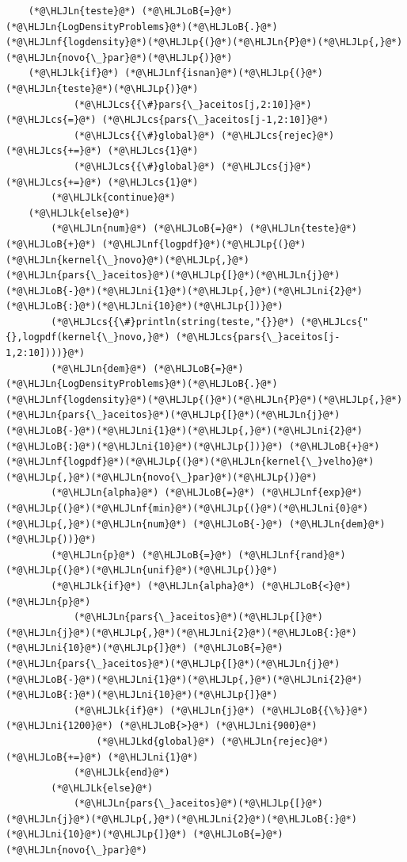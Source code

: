 \documentclass[12pt,a4paper]{article}
\newcommand{\HLJLk}[1]{\textcolor[RGB]{148,91,176}{\textbf{#1}}}
\newcommand{\HLJLkd}[1]{\textcolor[RGB]{214,102,97}{\textit{#1}}}
\newcommand{\HLJLn}[1]{#1}
\newcommand{\HLJLnf}[1]{\textcolor[RGB]{66,102,213}{#1}}
\newcommand{\HLJLni}[1]{\textcolor[RGB]{59,151,46}{#1}}
\newcommand{\HLJLoB}[1]{\textcolor[RGB]{102,102,102}{\textbf{#1}}}
\newcommand{\HLJLp}[1]{#1}
\newcommand{\HLJLcs}[1]{\textcolor[RGB]{153,153,119}{\textit{#1}}}
\begin{document}
\begin{lstlisting}
    (*@\HLJLn{teste}@*) (*@\HLJLoB{=}@*) (*@\HLJLn{LogDensityProblems}@*)(*@\HLJLoB{.}@*)(*@\HLJLnf{logdensity}@*)(*@\HLJLp{(}@*)(*@\HLJLn{P}@*)(*@\HLJLp{,}@*)(*@\HLJLn{novo{\_}par}@*)(*@\HLJLp{)}@*)
    (*@\HLJLk{if}@*) (*@\HLJLnf{isnan}@*)(*@\HLJLp{(}@*)(*@\HLJLn{teste}@*)(*@\HLJLp{)}@*)
            (*@\HLJLcs{{\#}pars{\_}aceitos[j,2:10]}@*) (*@\HLJLcs{=}@*) (*@\HLJLcs{pars{\_}aceitos[j-1,2:10]}@*)
            (*@\HLJLcs{{\#}global}@*) (*@\HLJLcs{rejec}@*) (*@\HLJLcs{+=}@*) (*@\HLJLcs{1}@*)
            (*@\HLJLcs{{\#}global}@*) (*@\HLJLcs{j}@*) (*@\HLJLcs{+=}@*) (*@\HLJLcs{1}@*)
        (*@\HLJLk{continue}@*)
    (*@\HLJLk{else}@*)
        (*@\HLJLn{num}@*) (*@\HLJLoB{=}@*) (*@\HLJLn{teste}@*) (*@\HLJLoB{+}@*) (*@\HLJLnf{logpdf}@*)(*@\HLJLp{(}@*)(*@\HLJLn{kernel{\_}novo}@*)(*@\HLJLp{,}@*)(*@\HLJLn{pars{\_}aceitos}@*)(*@\HLJLp{[}@*)(*@\HLJLn{j}@*)(*@\HLJLoB{-}@*)(*@\HLJLni{1}@*)(*@\HLJLp{,}@*)(*@\HLJLni{2}@*)(*@\HLJLoB{:}@*)(*@\HLJLni{10}@*)(*@\HLJLp{])}@*)
        (*@\HLJLcs{{\#}println(string(teste,"{}}@*) (*@\HLJLcs{"{},logpdf(kernel{\_}novo,}@*) (*@\HLJLcs{pars{\_}aceitos[j-1,2:10])))}@*)
        (*@\HLJLn{dem}@*) (*@\HLJLoB{=}@*) (*@\HLJLn{LogDensityProblems}@*)(*@\HLJLoB{.}@*)(*@\HLJLnf{logdensity}@*)(*@\HLJLp{(}@*)(*@\HLJLn{P}@*)(*@\HLJLp{,}@*)(*@\HLJLn{pars{\_}aceitos}@*)(*@\HLJLp{[}@*)(*@\HLJLn{j}@*)(*@\HLJLoB{-}@*)(*@\HLJLni{1}@*)(*@\HLJLp{,}@*)(*@\HLJLni{2}@*)(*@\HLJLoB{:}@*)(*@\HLJLni{10}@*)(*@\HLJLp{])}@*) (*@\HLJLoB{+}@*) (*@\HLJLnf{logpdf}@*)(*@\HLJLp{(}@*)(*@\HLJLn{kernel{\_}velho}@*)(*@\HLJLp{,}@*)(*@\HLJLn{novo{\_}par}@*)(*@\HLJLp{)}@*)
        (*@\HLJLn{alpha}@*) (*@\HLJLoB{=}@*) (*@\HLJLnf{exp}@*)(*@\HLJLp{(}@*)(*@\HLJLnf{min}@*)(*@\HLJLp{(}@*)(*@\HLJLni{0}@*)(*@\HLJLp{,}@*)(*@\HLJLn{num}@*) (*@\HLJLoB{-}@*) (*@\HLJLn{dem}@*)(*@\HLJLp{))}@*)
        (*@\HLJLn{p}@*) (*@\HLJLoB{=}@*) (*@\HLJLnf{rand}@*)(*@\HLJLp{(}@*)(*@\HLJLn{unif}@*)(*@\HLJLp{)}@*)
        (*@\HLJLk{if}@*) (*@\HLJLn{alpha}@*) (*@\HLJLoB{<}@*) (*@\HLJLn{p}@*)
            (*@\HLJLn{pars{\_}aceitos}@*)(*@\HLJLp{[}@*)(*@\HLJLn{j}@*)(*@\HLJLp{,}@*)(*@\HLJLni{2}@*)(*@\HLJLoB{:}@*)(*@\HLJLni{10}@*)(*@\HLJLp{]}@*) (*@\HLJLoB{=}@*) (*@\HLJLn{pars{\_}aceitos}@*)(*@\HLJLp{[}@*)(*@\HLJLn{j}@*)(*@\HLJLoB{-}@*)(*@\HLJLni{1}@*)(*@\HLJLp{,}@*)(*@\HLJLni{2}@*)(*@\HLJLoB{:}@*)(*@\HLJLni{10}@*)(*@\HLJLp{]}@*)
            (*@\HLJLk{if}@*) (*@\HLJLn{j}@*) (*@\HLJLoB{{\%}}@*) (*@\HLJLni{1200}@*) (*@\HLJLoB{>}@*) (*@\HLJLni{900}@*)
                (*@\HLJLkd{global}@*) (*@\HLJLn{rejec}@*) (*@\HLJLoB{+=}@*) (*@\HLJLni{1}@*)
            (*@\HLJLk{end}@*)
        (*@\HLJLk{else}@*)
            (*@\HLJLn{pars{\_}aceitos}@*)(*@\HLJLp{[}@*)(*@\HLJLn{j}@*)(*@\HLJLp{,}@*)(*@\HLJLni{2}@*)(*@\HLJLoB{:}@*)(*@\HLJLni{10}@*)(*@\HLJLp{]}@*) (*@\HLJLoB{=}@*) (*@\HLJLn{novo{\_}par}@*)

\end{lstlisting}
\end{document}
